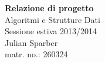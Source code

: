 \documentclass[11pt, a4paper, titlepage, block]{article}
\begin{document}
\begin{titlepage}

\newcommand{\HRule}{\rule{\linewidth}{0.5mm}} %

\center %
 




{ \huge \bfseries Relazione di progetto}\\[1.2cm]

{\LARGE Algoritmi e Strutture Dati}\\[0.5cm]
{\large Sessione estiva 2013/2014}
\\[1.5cm]

{\large Julian Sparber}\\[0.2cm]
{\large matr. no.: 260324}\\[1cm]





 

\newpage

\end{titlepage}
\end{document}
